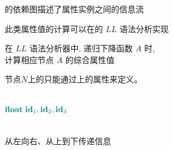 \begin{frame}{}
  \begin{center}
    的依赖图描述了属性实例之间的信息流

    \vspace{0.80cm}
    此类属性值的计算可以在的 $LL$ 语法分析实现

    \pause
    \vspace{0.80cm}
    在 $LL$ 语法分析器中, 递归下降函数 $A$  时, \\[3pt]
    计算相应节点 $A$ 的综合属性值
  \end{center}
\end{frame}

\begin{frame}{}
  \begin{center}
    \begin{definition}
      节点$N$上的只能通过上的属性来定义。
    \end{definition}

    \begin{columns}
        \[
            \textcolor{teal}{\text{\bf float}\; \text{\bf id}_{1}, \text{\bf id}_{2}, \text{\bf id}_{3}}
        \]
    \end{columns}

    \pause
    \vspace{0.30cm}
     从左向右、从上到下传递信息

  \end{center}
\end{frame}



